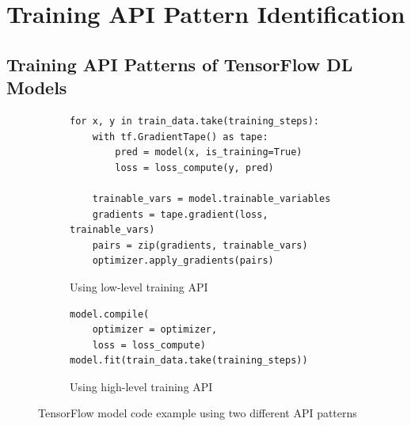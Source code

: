 \section{Training API Pattern Identification}\label{sec:pattern}

\subsection{Training API Patterns of TensorFlow DL Models}

\renewcommand\tabularxcolumn[1]{m{#1}}
\begin{figure}[ht!]
\centering
  \begin{subfigure}[b]{\textwidth}
    \begin{lstlisting}[style=mpython]
for x, y in train_data.take(training_steps):
    with tf.GradientTape() as tape:
        pred = model(x, is_training=True)
        loss = loss_compute(y, pred)

    trainable_vars = model.trainable_variables
    gradients = tape.gradient(loss, trainable_vars)
    pairs = zip(gradients, trainable_vars)
    optimizer.apply_gradients(pairs)\end{lstlisting}
    \caption{Using low-level training API}
    \label{fig:pattern:ex01:a}
  \end{subfigure}
  \hspace{5mm}
  \begin{subfigure}[b]{\textwidth}
    \begin{lstlisting}[style=mpython]
model.compile(
    optimizer = optimizer, 
    loss = loss_compute) 
model.fit(train_data.take(training_steps))\end{lstlisting} 
    \caption{Using high-level training API}
    \label{fig:pattern:ex01:b}
  \end{subfigure}

  \caption{TensorFlow model code example using two different API patterns}
  \label{fig:pattern:ex01}
\end{figure}

\noindent

